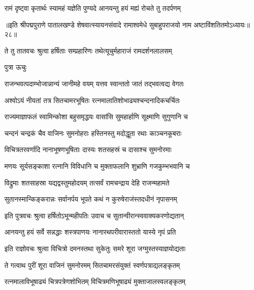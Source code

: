 \twolineshloka
{रामं दृष्ट्वा कृतार्थः स्यामहं यज्ञेति पुण्यदे}
{आनयन्तु हयं मह्यं रोचते तु तदर्पणम्}%

॥इति श्रीपद्मपुराणे पातालखण्डे शेषवात्स्यायनसंवादे रामाश्वमेधे सुबाहुपराजयो नाम अष्टाविंशतितमोऽध्यायः॥२८॥



\twolineshloka
{ते तु तातवचः श्रुत्वा हर्षिताः सम्प्रहारिणः}
{तथेत्यूचुर्महाराजं रामदर्शनलालसम्}%

पुत्रा ऊचुः

\twolineshloka
{राजन्भवत्पदाम्भोजान्नान्यं जानीमहे वयम्}
{यत्तव स्वान्ततो जातं तद्भवत्वद्य वेगतः}%

\twolineshloka
{अश्वोऽयं नीयतां तत्र सितचामरभूषितः}
{रत्नमालातिशोभाढ्यश्चन्दनादिकचर्चितः}%

\twolineshloka
{राज्यमाज्ञाफलं स्वामिन्कोशा बहुसमृद्धयः}
{वासांसि सुमहार्हाणि सूक्ष्माणि सुगुणानि च}%

\twolineshloka
{चन्दनं चन्द्रकं चैव वाजिनः सुमनोहराः}
{हस्तिनस्तु मदोद्धूता रथाः काञ्चनकूबराः}%

\twolineshloka
{विचित्रतरवर्णादि नानाभूषणभूषिताः}
{दास्यः शतसहस्रं च दासाश्च सुमनोरमाः}%

\twolineshloka
{मणयः सूर्यसङ्काशा रत्नानि विविधानि च}
{मुक्ताफलानि शुभ्राणि गजकुम्भभवानि च}%

\twolineshloka
{विद्रुमाः शतसाहस्रा यद्यद्वस्तुमहोदयम्}
{तत्सर्वं रामचन्द्राय देहि राजन्महामते}%

\twolineshloka
{सुतानस्मान्किङ्करान्नः सर्वानर्पय भूपते}
{कथं न कुरुषेराजंस्तदधीनं नृपासनम्}%


\twolineshloka
{इति पुत्रवचः श्रुत्वा हर्षितोऽभून्महीपतिः}
{उवाच च सुतान्वीरान्स्ववाक्यकरणोद्यतान्}%


\twolineshloka
{आनयन्तु हयं सर्वे सन्नद्धाः शस्त्रपाणयः}
{नानारथपरीवारास्ततो यास्ये नृपं प्रति}%


\twolineshloka
{इति राज्ञोवचः श्रुत्वा विचित्रो दमनस्तथा}
{सुकेतुः समरे शूरा जग्मुस्तस्याज्ञयोद्यताः}%

\twolineshloka
{ते गत्वाथ पुरीं शूरा वाजिनं सुमनोरमम्}
{सितचामरसंयुक्तं स्वर्णपत्राद्यलङ्कृतम्}%

\twolineshloka
{रत्नमालाविभूषाढ्यं चित्रपत्रेणशोभितम्}
{विचित्रमणिभूषाढ्यं मुक्ताजालस्वलङ्कृतम्}%

